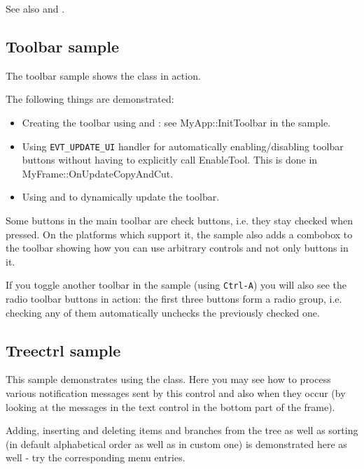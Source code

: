 See also  and .


\subsection{Toolbar sample}\label{sampletoolbar}

The toolbar sample shows the  class in action.

The following things are demonstrated:

\begin{itemize}\itemsep=0pt
\item Creating the toolbar using 
and : see
MyApp::InitToolbar in the sample.
\item Using {\tt EVT\_UPDATE\_UI} handler for automatically enabling/disabling
toolbar buttons without having to explicitly call EnableTool. This is done
in MyFrame::OnUpdateCopyAndCut.
\item Using  and
 to dynamically update the
toolbar.
\end{itemize}

Some buttons in the main toolbar are check buttons, i.e. they stay checked when
pressed. On the platforms which support it, the sample also adds a combobox
to the toolbar showing how you can use arbitrary controls and not only buttons
in it.

If you toggle another toolbar in the sample (using {\tt Ctrl-A}) you will also
see the radio toolbar buttons in action: the first three buttons form a radio
group, i.e. checking any of them automatically unchecks the previously
checked one.


\subsection{Treectrl sample}\label{sampletreectrl}

This sample demonstrates using the  class. Here
you may see how to process various notification messages sent by this control
and also when they occur (by looking at the messages in the text control in
the bottom part of the frame).

Adding, inserting and deleting items and branches from the tree as well as
sorting (in default alphabetical order as well as in custom one) is
demonstrated here as well - try the corresponding menu entries.


